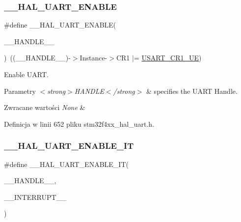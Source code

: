 \subsubsection{\texorpdfstring{\+\_\+\+\_\+\+H\+A\+L\+\_\+\+U\+A\+R\+T\+\_\+\+E\+N\+A\+B\+LE}{\_\_HAL\_UART\_ENABLE}}
{\footnotesize\ttfamily \#define \+\_\+\+\_\+\+H\+A\+L\+\_\+\+U\+A\+R\+T\+\_\+\+E\+N\+A\+B\+LE(\begin{DoxyParamCaption}\item[{}]{\+\_\+\+\_\+\+H\+A\+N\+D\+L\+E\+\_\+\+\_\+ }\end{DoxyParamCaption})~((\+\_\+\+\_\+\+H\+A\+N\+D\+L\+E\+\_\+\+\_\+)-\/$>$Instance-\/$>$C\+R1 $\vert$=  \hyperlink{group___peripheral___registers___bits___definition_ga2bb650676aaae4a5203f372d497d5947}{U\+S\+A\+R\+T\+\_\+\+C\+R1\+\_\+\+UE})}



Enable U\+A\+RT. 


\begin{DoxyParams}{Parametry}
{\em $<$strong$>$\+H\+A\+N\+D\+L\+E$<$/strong$>$} & specifies the U\+A\+RT Handle. \\
\hline
\end{DoxyParams}

\begin{DoxyRetVals}{Zwracane wartości}
{\em None} & \\
\hline
\end{DoxyRetVals}


Definicja w linii 652 pliku stm32f4xx\+\_\+hal\+\_\+uart.\+h.

\mbox{\label{group___u_a_r_t___exported___macros_gaba94165ed584d49c1ec12df9819bd4bb}} 
\subsubsection{\texorpdfstring{\+\_\+\+\_\+\+H\+A\+L\+\_\+\+U\+A\+R\+T\+\_\+\+E\+N\+A\+B\+L\+E\+\_\+\+IT}{\_\_HAL\_UART\_ENABLE\_IT}}
{\footnotesize\ttfamily \#define \+\_\+\+\_\+\+H\+A\+L\+\_\+\+U\+A\+R\+T\+\_\+\+E\+N\+A\+B\+L\+E\+\_\+\+IT(\begin{DoxyParamCaption}\item[{}]{\+\_\+\+\_\+\+H\+A\+N\+D\+L\+E\+\_\+\+\_\+,  }\item[{}]{\+\_\+\+\_\+\+I\+N\+T\+E\+R\+R\+U\+P\+T\+\_\+\+\_\+ }\end{DoxyParamCaption})}

